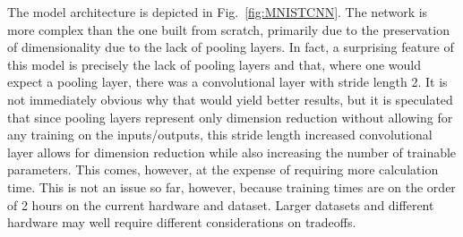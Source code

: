\documentclass[a4paper,fleqn,usenatbib]{mnras}
\begin{document}
The model architecture is depicted in Fig.~\ref{fig:MNISTCNN}. The network is more complex than the one built from scratch, primarily due to the preservation of dimensionality due to the lack of pooling layers. In fact, a surprising feature of this model is precisely the lack of pooling layers and that, where one would expect a pooling layer, there was a convolutional layer with stride length 2. It is not immediately obvious why that would yield better results, but it is speculated that since pooling layers represent only dimension reduction without allowing for any training on the inputs/outputs, this stride length increased convolutional layer allows for dimension reduction while also increasing the number of trainable parameters. This comes, however, at the expense of requiring more calculation time. This is not an issue so far, however, because training times are on the order of 2 hours on the current hardware and dataset. Larger datasets and different hardware may well require different considerations on tradeoffs. 
\end{document}
